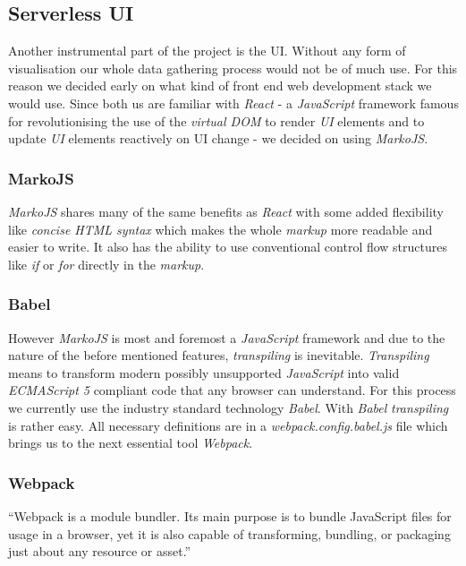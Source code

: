 \subsection{Serverless UI}

Another instrumental part of the project is the UI. Without any form of visualisation our whole data
gathering process would not be of much use. For this reason we decided early on what kind of front
end web development stack we would use. Since both us are familiar with \textit{React} - a
\textit{JavaScript} framework famous for revolutionising the use of the \textit{virtual DOM}
to render \textit{UI} elements and to update \textit{UI} elements reactively on
UI change - we decided on using \textit{MarkoJS}.

\subsubsection{MarkoJS}

\textit{MarkoJS} shares many of the same benefits as \textit{React} with some added flexibility like
\textit{concise HTML syntax} which makes the whole \textit{markup} more readable and easier to
write. It also has the ability to use conventional control flow structures like \textit{if} or
\textit{for} directly in the \textit{markup}.

\subsubsection{Babel}

However \textit{MarkoJS} is most and foremost a \textit{JavaScript} framework and due to the nature
of the before mentioned features, \textit{transpiling} is inevitable. \textit{Transpiling} means to
transform modern possibly unsupported \textit{JavaScript} into valid \textit{ECMAScript 5} compliant
code that any browser can understand. For this process we currently use the industry standard
technology \textit{Babel}. With \textit{Babel} \textit{transpiling} is rather easy. All necessary
definitions are in a \textit{webpack.config.babel.js} file which brings us to the next essential
tool \textit{Webpack}.

\subsubsection{Webpack}

“Webpack is a module bundler. Its main purpose is to bundle JavaScript files for usage in a browser,
yet it is also capable of transforming, bundling, or packaging just about any resource or asset.”

